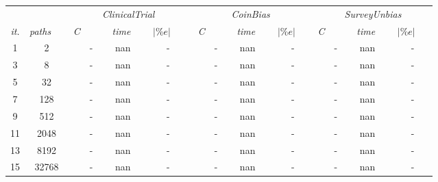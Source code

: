 \documentclass[a4paper]{llncs}
\begin{document}
\begin{table}[t]
{\begin{tabular}{ccrccrccrcc}
    & & \multicolumn{3}{c}{\emph{ClinicalTrial}}&\multicolumn{3}{c}{\emph{CoinBias}} & \multicolumn{3}{c}{\emph{SurveyUnbias}} \\
         \cmidrule(l){3-5}  \cmidrule(l){6-8} \cmidrule(l){9-11}  
    \emph{it.} & \emph{paths}  \ \ & \emph{C} \ \ & \ \ \emph{time} \ \ & \emph{$|\%e|$} \ \ &\ \emph{C} \ \ & \ \ \emph{time} \ \ & \emph{$|\%e|$} \ \ & \emph{C} \ \ & \ \ \emph{time} \ \ & \emph{$|\%e|$} \ \ \\
    \midrule  
    1 &  2 & - & nan & - & - & nan & - & - & nan & -\\
    3 &  8 & - & nan & - & - & nan & - & - & nan & -\\
    5 &  32 & - & nan & - & - & nan & - & - & nan & -\\
    7 &  128 & - & nan & - & - & nan & - & - & nan & -\\
    9 &  512 & - & nan & - & - & nan & - & - & nan & -\\
    11 &  2048 & - & nan & - & - & nan & - & - & nan & -\\
    13 &  8192 & - & nan & - & - & nan & - & - & nan & -\\
    15 &  32768 & - & nan & - & - & nan & - & - & nan & -\\
    \bottomrule
   \end{tabular}}
   \label{tab:sensBranch}
\end{table}
\end{document}
